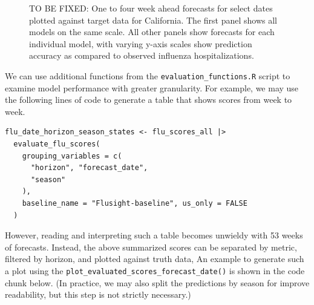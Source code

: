 \documentclass[
  article,
  shortnames,
  notitle]{jss}
\begin{document}
\begin{figure}[H]


\caption{\label{fig-plot-forecasts-hubVis}TO BE FIXED: One to four week
ahead forecasts for select dates plotted against target data for
California. The first panel shows all models on the same scale. All
other panels show forecasts for each individual model, with varying
y-axis scales show prediction accuracy as compared to observed influenza
hospitalizations.}

\end{figure}%

We can use additional functions from the
\texttt{evaluation\_functions.R} script to examine model performance
with greater granularity. For example, we may use the following lines of
code to generate a table that shows scores from week to week.

\begin{verbatim}
flu_date_horizon_season_states <- flu_scores_all |>
  evaluate_flu_scores(
    grouping_variables = c(
      "horizon", "forecast_date",
      "season"
    ),
    baseline_name = "Flusight-baseline", us_only = FALSE
  )
\end{verbatim}

However, reading and interpreting such a table becomes unwieldy with 53
weeks of forecasts. Instead, the above summarized scores can be
separated by metric, filtered by horizon, and plotted against truth
data, An example to generate such a plot using the
\texttt{plot\_evaluated\_scores\_forecast\_date()} is shown in the code
chunk below. (In practice, we may also split the predictions by season
for improve readability, but this step is not strictly necessary.)
\end{document}
